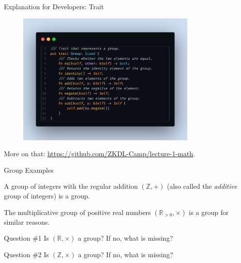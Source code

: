 \documentclass{beamer}
\begin{document}
    \begin{frame}{Explanation for Developers: Trait}
      \begin{center}
        \begin{figure}
          \includegraphics[width=0.8\textwidth]{images/lecture_1/group_in_rust.png}
          \label{fig:group_in_rust}
        \end{figure}

        More on that: \url{https://github.com/ZKDL-Camp/lecture-1-math}.
      \end{center}
    \end{frame}

    \begin{frame}{Group Examples}
      \begin{example}
        A group of integers with the regular addition $(\mathbb{Z},+)$ (also called the \textit{additive} group of integers) is a group.\pause
      \end{example}
      
      \begin{example}
          The multiplicative group of positive real numbers $(\mathbb{R}_{> 0}, \times)$ is a group for similar reasons.\pause
      \end{example}
      
      \begin{alertblock}{Question \#1}
          Is $(\mathbb{R}, \times)$ a group? If no, what is missing?\pause
      \end{alertblock}

      \begin{alertblock}{Question \#2}
        Is $(\mathbb{Z}, \times)$ a group? If no, what is missing?
      \end{alertblock}
    \end{frame}
\end{document}
